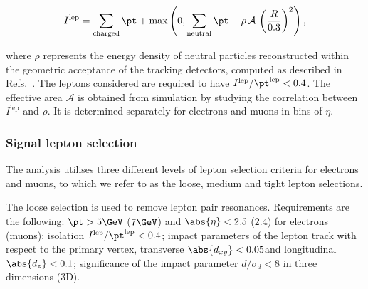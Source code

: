\begin{equation}
  I^{\text{lep}} = \sum_{\text{charged}} \pt + \max \left( 0, \sum_{\text{neutral}} \pt - \rho \, \mathcal{A} \, \left(\frac{R}{0.3}\right)^{2} \right),
  \label{eq:lepMiniIsolation}
\end{equation}

where $\rho$ represents the energy density of neutral particles reconstructed within the geometric acceptance of the tracking detectors, computed as described in Refs.~\cite{Cacciari:2008gn, Cacciari:2007fd}. The leptons considered are required to have $I^{\text{lep}}/\pt^{\text{lep}} < 0.4$. The effective area $\mathcal{A}$ is obtained from simulation by studying the correlation between $I^{\text{lep}}$ and $\rho$. It is determined separately for electrons and muons in bins of $\eta$.

\subsubsection{Signal lepton selection}
\label{signal_leptons}
The analysis utilises three different levels of lepton selection criteria for electrons and muons, to which we refer to as the loose, medium and tight lepton selections.

The loose selection is used to remove lepton pair resonances. Requirements are the following: $\pt>5\GeV$ ($7\GeV$) and $\abs{\eta} < 2.5$ ($2.4$) for electrons (muons); isolation $I^{\text{lep}}/\pt^{\text{lep}}<0.4$; impact parameters of the lepton track with respect to the primary vertex, transverse $\abs{d_{xy}}<0.05$\cm and longitudinal $\abs{d_{z} }<0.1$\cm; significance of the impact parameter $d/\sigma_{d}<8$ in three dimensions (3D).

